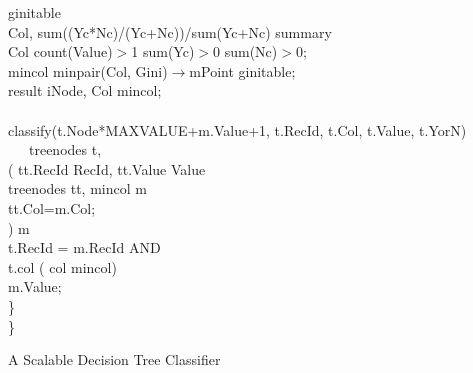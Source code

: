 {\begin{algorithm}[!htb]
\begin{algorithmic}[1]
\STATE\hspace{.6cm}  ginitable\\
\hspace{.9cm} Col, sum((Yc*Nc)/(Yc+Nc))/sum(Yc+Nc)  summary\\
\hspace{.9cm} Col  count(Value)$>$1  sum(Yc)$>$0  sum(Nc)$>$0;\\
\STATE{}\hspace{.6cm}  mincol  minpair(Col, Gini)$\rightarrow$mPoint  ginitable;\\
\STATE\hspace{.6cm}  result  iNode, Col  mincol;\\
\hspace{.6cm}\\
\STATE\hspace{.6cm} classify(t.Node*MAXVALUE+m.Value+1, t.RecId, t.Col, t.Value, t.YorN)\\
\hspace{.9cm}\ \ \ treenodes  t,\\
\hspace{1.2cm}(  tt.RecId RecId, tt.Value Value\\
\hspace{1.3cm}   treenodes  tt, mincol  m\\
\hspace{1.3cm}   tt.Col=m.Col; \\
\hspace{1.2cm}\kw{})  m\\
\hspace{.9cm} t.RecId = m.RecId AND\\
\hspace{2.1cm}t.col  ( col  mincol)\\
\hspace{.9cm} m.Value;\\
\hspace{.3cm}\}\\
\STATE\}
\end{algorithmic}
\caption{A Scalable Decision Tree Classifier}
\label{alg:sprint}
\end{algorithm}


}
